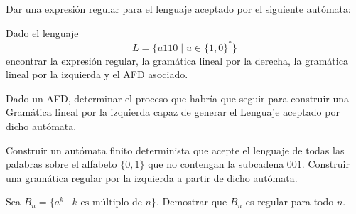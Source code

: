 \begin{ejercicio}
Dar una expresión regular para el lenguaje aceptado por el siguiente autómata:
\begin{figure}[H]
    \centering
\end{figure}
\end{ejercicio}

\begin{ejercicio}
Dado el lenguaje
$$L = \{u110 \mid u \in \{1, 0\}^*\}$$
encontrar la expresión regular, la gramática lineal por la derecha, la gramática lineal por la izquierda y el AFD asociado.
\end{ejercicio}

\begin{ejercicio}
Dado un AFD, determinar el proceso que habría que seguir para construir una Gramática lineal por la izquierda capaz de generar el Lenguaje aceptado por dicho autómata.
\end{ejercicio}

\begin{ejercicio}
Construir un autómata finito determinista que acepte el lenguaje de todas las palabras sobre el alfabeto $\{0, 1\}$ que no contengan la subcadena $001$. Construir una gramática regular por la izquierda a partir de dicho autómata.
\end{ejercicio}

\begin{ejercicio}
Sea $B_n = \{a^k \mid k \text{ es múltiplo de } n\}$. Demostrar que $B_n$ es regular para todo $n$.
\end{ejercicio}

